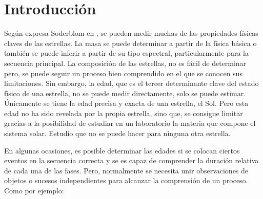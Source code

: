 
\chapter{Introducción} 
\label{sec:intro}
 
Según expresa Soderblom en \cite{Soderblom10}, se pueden medir muchas de las propiedades físicas claves de las estrellas. La masa se puede determinar a partir de la física básica o también se puede inferir a partir de su tipo espectral, particularmente para la secuencia principal. La composición de las estrellas, no es fácil de determinar pero, se puede seguir un proceso bien comprendido en el que se conocen sus limitaciones. Sin embargo, la edad, que es el tercer determinante clave del estado físico de una estrella, no se puede medir directamente, solo se puede estimar. Únicamente se tiene la edad precisa y exacta de una estrella, el Sol. Pero esta edad no ha sido revelada por la propia estrella, sino que, se consigue limitar gracias a la posibilidad de estudiar en un laboratorio la materia que compone el sistema solar. Estudio que no se puede hacer para ninguna otra estrella.

En algunas ocasiones, es posible determinar las edades si se colocan ciertos eventos en la secuencia correcta y se es capaz de comprender la duración relativa de cada una de las fases. Pero, normalmente se necesita unir observaciones de objetos o sucesos independientes para alcanzar la comprensión de un proceso. Como por ejemplo:

